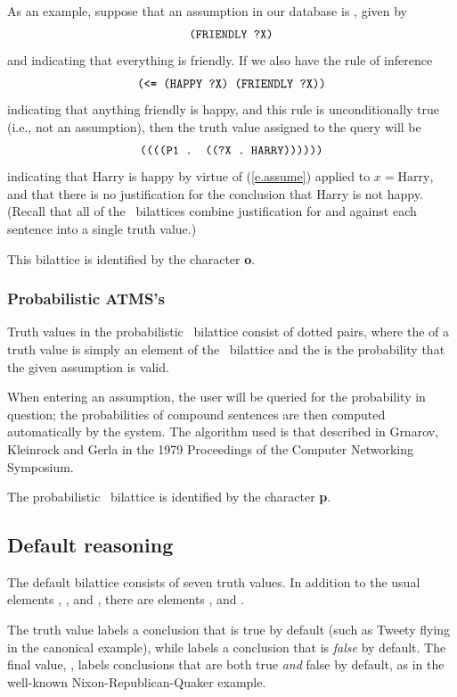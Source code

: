 As an example, suppose that an assumption in our database is ,
given by
 \begin{equation}
\mbox{\tt (FRIENDLY ?X)}
\label{e.assume}
\end{equation}
 and indicating that everything is friendly.  If we also have the rule
of inference
 \[\mbox{\tt (<= (HAPPY ?X) (FRIENDLY ?X))}\]
 indicating that anything friendly is happy, and this rule is unconditionally
true (i.e., not an assumption), then the truth value assigned to the
query  will be
 \[\mbox{\tt ((((P1 . ((?X . HARRY))))))}\]
 indicating that Harry is happy by virtue of (\ref{e.assume}) applied
to $x=\mbox{Harry}$, and that there is no justification for the
conclusion that Harry is not happy.  (Recall that all of the \atms\
bilattices combine justification for and against each sentence into a
single truth value.)

This bilattice is identified by the character {\bf o}.

\subsubsection{Probabilistic ATMS's}
\label{s.prob}

Truth values in the probabilistic \atms\ bilattice consist of dotted
pairs, where the \type{car} of a truth value is simply an element of
the \atms\ bilattice and the \type{cdr} is the probability that the
given assumption is valid.

When entering an assumption, the user will be queried for the
probability in question; the probabilities of compound sentences are
then computed automatically by the system.  The algorithm used is
that described in Grnarov, Kleinrock and Gerla in the 1979
Proceedings of the Computer Networking Symposium.

The probabilistic \atms\ bilattice is identified by the character
{\bf p}.
  
\subsection{Default reasoning} 
\label{s.j}

The default bilattice consists of seven truth values.  In addition to
the usual elements \type{true}, \type{false}, \type{unknown} and
\type{bottom}, there are elements \type{dt}, \type{df} and \type{*}.

The truth value  labels a conclusion that is true by default
(such as Tweety flying in the canonical example), while \type{df} labels
a conclusion that is {\em false\/} by default.  The final value,
\type{*}, labels conclusions that are both true {\em and\/} false
by default, as in the well-known Nixon-Republican-Quaker example.

